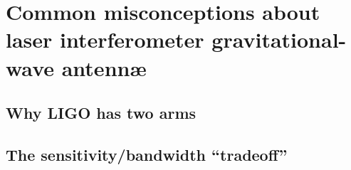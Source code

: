 \chapter{Common misconceptions about laser interferometer gravitational-wave antenn\ae}

\section{Why LIGO has two arms}

\section{The sensitivity/bandwidth ``tradeoff''}


